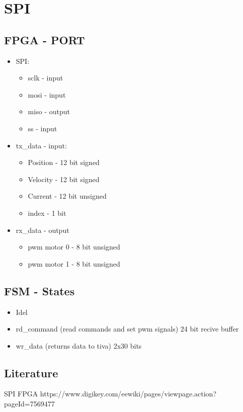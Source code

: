 \documentclass[../main]{subfiles}
\begin{document}
\section{SPI}
\label{sec:indledning}

\subsection{FPGA - PORT}
\begin{itemize}
  \item SPI:
  \begin{itemize}
    \item sclk - input
    \item mosi - input
    \item miso - output
    \item ss - input
  \end{itemize}
  \item tx\_data - input:
  \begin{itemize}
    \item Position - 12 bit signed
    \item Velocity - 12 bit signed
    \item Current - 12 bit unsigned
    \item index - 1 bit
  \end{itemize}
  \item rx\_data - output
  \begin{itemize}
    \item pwm motor 0 - 8 bit unsigned
    \item pwm motor 1 - 8 bit unsigned
  
  \end{itemize}

\end{itemize}

\subsection{FSM - States}
\begin{itemize}
  \item Idel
  \item rd\_command (read commands and set pwm signals) 24 bit recive buffer
  \item wr\_data (returns data to tiva) 2x30 bits
\end{itemize}

\subsection{Literature}
SPI FPGA https://www.digikey.com/eewiki/pages/viewpage.action?pageId=7569477
\end{document}
